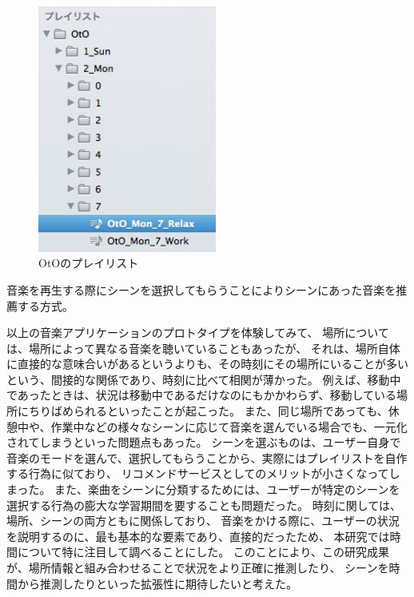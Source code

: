 \documentclass[11pt, twocolumn]{jsarticle}
\begin{document}
\begin{enumerate}
\begin{figure}[h]
\begin{center}
\includegraphics[width=5.866cm]{OtO_playList.jpg}
\caption{OtOのプレイリスト}
\label{OtO_playlist}
\end{center}
\end{figure}


音楽を再生する際にシーンを選択してもらうことによりシーンにあった音楽を推薦する方式。
\end{enumerate}

以上の音楽アプリケーションのプロトタイプを体験してみて、
場所については、場所によって異なる音楽を聴いていることもあったが、
それは、場所自体に直接的な意味合いがあるというよりも、その時刻にその場所にいることが多いという、間接的な関係であり、時刻に比べて相関が薄かった。
例えば、移動中であったときは、状況は移動中であるだけなのにもかかわらず、移動している場所にちりばめられるといったことが起こった。
また、同じ場所であっても、休憩中や、作業中などの様々なシーンに応じて音楽を選んでいる場合でも、一元化されてしまうといった問題点もあった。
シーンを選ぶものは、ユーザー自身で音楽のモードを選んで、選択してもらうことから、実際にはプレイリストを自作する行為に似ており、
リコメンドサービスとしてのメリットが小さくなってしまった。
また、楽曲をシーンに分類するためには、ユーザーが特定のシーンを選択する行為の膨大な学習期間を要することも問題だった。
時刻に関しては、場所、シーンの両方ともに関係しており、
音楽をかける際に、ユーザーの状況を説明するのに、最も基本的な要素であり、直接的だったため、
本研究では時間について特に注目して調べることにした。
このことにより、この研究成果が、場所情報と組み合わせることで状況をより正確に推測したり、
シーンを時間から推測したりといった拡張性に期待したいと考えた。
\end{document}
